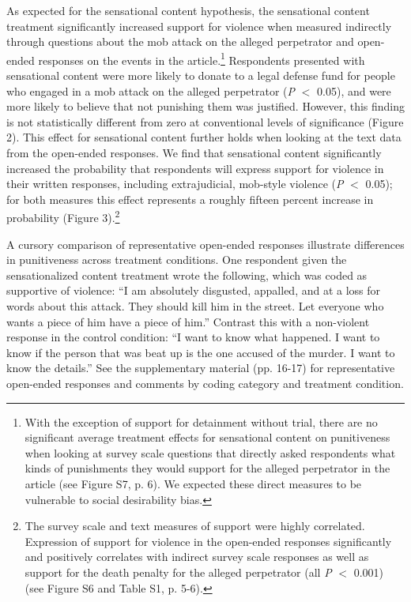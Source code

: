 As expected for the sensational content hypothesis, the sensational content treatment significantly increased support for violence when measured indirectly through questions about the mob attack on the alleged perpetrator and open-ended responses on the events in the article.\footnote{With the exception of support for detainment without trial, there are no significant average treatment effects for sensational content on punitiveness when looking at survey scale questions that directly asked respondents what kinds of punishments they would support for the alleged perpetrator in the article (see Figure S7, p. 6). We expected these direct measures to be vulnerable to social desirability bias.} Respondents presented with sensational content were more likely to donate to a legal defense fund for people who engaged in a mob attack on the alleged perpetrator (\textit{P} $<$ 0.05), and were more likely to believe that not punishing them was justified. However, this finding is not statistically different from zero at conventional levels of significance (Figure 2). This effect for sensational content further holds when looking at the text data from the open-ended responses. We find that sensational content significantly increased the probability that respondents will express support for violence in their written responses, including extrajudicial, mob-style violence (\textit{P} $<$ 0.05); for both measures this effect represents a roughly fifteen percent increase in probability (Figure 3).\footnote{The survey scale and text measures of support were highly correlated. Expression of support for violence in the open-ended responses significantly and positively correlates with indirect survey scale responses as well as support for the death penalty for the alleged perpetrator (all \textit{P} $<$ 0.001) (see Figure S6 and Table S1, p. 5-6).} 

A cursory comparison of representative open-ended responses illustrate differences in punitiveness across treatment conditions. One respondent given the sensationalized content treatment wrote the following, which was coded as supportive of violence: ``I am absolutely disgusted, appalled, and at a loss for words about this attack.  They should kill him in the street. Let everyone who wants a piece of him have a piece of him.'' Contrast this with a non-violent response in the control condition: ``I want to know what happened. I want to know if the person that was beat up is the one accused of the murder. I want to know the details.'' See the supplementary material (pp. 16-17) for representative open-ended responses and comments by coding category and treatment condition.


